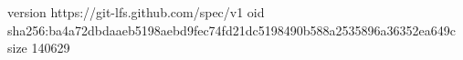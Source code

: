 version https://git-lfs.github.com/spec/v1
oid sha256:ba4a72dbdaaeb5198aebd9fec74fd21dc5198490b588a2535896a36352ea649c
size 140629
